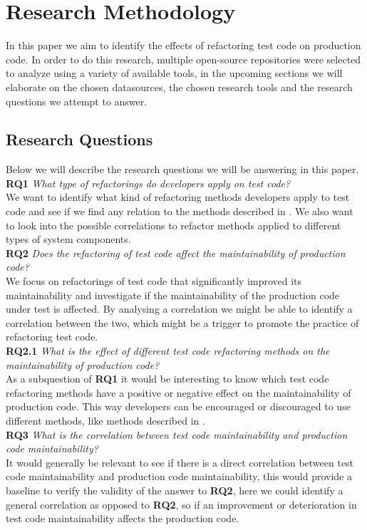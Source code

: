 \section{Research Methodology}
In this paper we aim to identify the effects of refactoring test code on production code. In order to do this research, multiple open-source repositories were selected to analyze using a variety of available tools, in the upcoming sections we will elaborate on the chosen datasources, the chosen research tools and the research questions we attempt to answer.

\subsection{Research Questions}\label{rqs}
Below we will describe the research questions we will be answering in this paper.\\
\indent\textbf{RQ1} \textit{What type of refactorings do developers apply on test code?}\\
We want to identify what kind of refactoring methods developers apply to test code and see if we find any relation to the methods described in \cite{van2001refactoring}. We also want to look into the possible correlations to refactor methods applied to different types of system components.\\
\indent\textbf{RQ2} \textit{Does the refactoring of test code affect the maintainability of production code?}\\
We focus on refactorings of test code that significantly improved its maintainability and investigate if the maintainability of the production code under test is affected. By analysing a correlation we might be able to identify a correlation between the two, which might be a trigger to promote the practice of refactoring test code.\\
\indent\textbf{RQ2.1} \textit{What is the effect of different test code refactoring methods on the maintainability of production code?}\\
As a subquestion of \textbf{RQ1} it would be interesting to know which test code refactoring methods have a positive or negative effect on the maintainability of production code. This way developers can be encouraged or discouraged to use different methods, like methods described in \cite{van2001refactoring}.\\
\indent\textbf{RQ3} \textit{What is the correlation between test code maintainability and production code maintainability?}\\
It would generally be relevant to see if there is a direct correlation between test code maintainability and production code maintainability, this would provide a baseline to verify the validity of the answer to \textbf{RQ2}, here we could identify a general correlation as opposed to \textbf{RQ2}, so if an improvement or deterioration in test code maintainability affects the production code.

